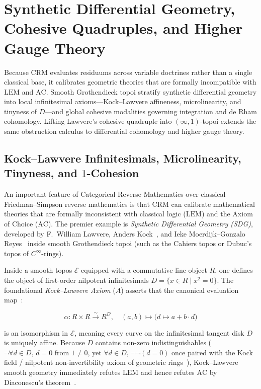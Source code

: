 \section{Synthetic Differential Geometry, Cohesive Quadruples, and Higher Gauge Theory}\label{sec:cohesive-lattice}

Because $\mathrm{CRM}$ evaluates residuums across variable doctrines rather than a single classical base, it calibrates geometric theories that are formally incompatible with $\mathrm{LEM}$ and $\mathrm{AC}$. Smooth Grothendieck topoi stratify synthetic differential geometry into local infinitesimal axioms---Kock--Lawvere affineness, microlinearity, and tinyness of $D$---and global cohesive modalities governing integration and de Rham cohomology. Lifting Lawvere's cohesive quadruple into $(\infty, 1)$-topoi extends the same obstruction calculus to differential cohomology and higher gauge theory.

\subsection{Kock--Lawvere Infinitesimals, Microlinearity, Tinyness, and $1$-Cohesion}

An important feature of Categorical Reverse Mathematics over classical Friedman--Simpson reverse mathematics is that $\mathrm{CRM}$ can calibrate mathematical theories that are formally inconsistent with classical logic ($\mathrm{LEM}$) and the Axiom of Choice ($\mathrm{AC}$). The premier example is \emph{Synthetic Differential Geometry (SDG)}, developed by F.~William Lawvere, Anders Kock~\cite{Kock06}, and Ieke Moerdijk--Gonzalo Reyes~\cite{MoerdijkReyes91} inside smooth Grothendieck topoi (such as the Cahiers topos or Dubuc's topos of $C^\infty$-rings).

Inside a smooth topos $\mathcal{E}$ equipped with a commutative line object $R$, one defines the object of first-order nilpotent infinitesimals $D = \{x \in R \mid x^2 = 0\}$. The foundational \emph{Kock--Lawvere Axiom} ($A$) asserts that the canonical evaluation map~\cite{Kock06,MoerdijkReyes91}:

\[
  \alpha: R \times R \xrightarrow{\sim} R^D, \quad (a, b) \mapsto \bigl(d \mapsto a + b \cdot d\bigr)
\]

is an isomorphism in $\mathcal{E}$, meaning every curve on the infinitesimal tangent disk $D$ is uniquely affine. Because $D$ contains non-zero indistinguishables ($\neg\forall d \in D,\, d = 0$ from $1 \neq 0$, yet $\forall d \in D,\, \neg\neg(d = 0)$ once paired with the Kock field / nilpotent non-invertibility axiom of geometric rings~\cite[Ch.~I, \S\S I.1--I.2]{Kock06}), Kock--Lawvere smooth geometry immediately refutes $\mathrm{LEM}$ and hence refutes $\mathrm{AC}$ by Diaconescu's theorem~\cite{Diaconescu75}.

